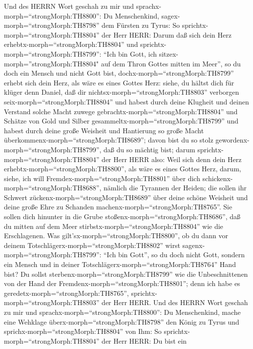  Und des HERRN Wort geschah zu mir und
sprachx-morph=``strongMorph:TH8800'':  Du Menschenkind,
sagex-morph=``strongMorph:TH8798'' dem Fürsten zu Tyrus: So
sprichtx-morph=``strongMorph:TH8804'' der Herr HERR: Darum daß sich dein
Herz erhebtx-morph=``strongMorph:TH8804'' und
sprichtx-morph=``strongMorph:TH8799'': ``Ich bin Gott, ich
sitzex-morph=''strongMorph:TH8804" auf dem Thron Gottes mitten im
Meer'', so du doch ein Mensch und nicht Gott bist,
dochx-morph=``strongMorph:TH8799'' erhebt sich dein Herz, als wäre es
eines Gottes Herz:  siehe, du hältst dich für klüger denn
Daniel, daß dir nichtsx-morph=``strongMorph:TH8803'' verborgen
seix-morph=``strongMorph:TH8804''  und habest durch deine
Klugheit und deinen Verstand solche Macht zuwege
gebrachtx-morph=``strongMorph:TH8804'' und Schätze von Gold und Silber
gesammeltx-morph=``strongMorph:TH8799''  und habest durch
deine große Weisheit und Hantierung so große Macht
überkommenx-morph=``strongMorph:TH8689''; davon bist du so stolz
gewordenx-morph=``strongMorph:TH8799'', daß du so mächtig bist;
 darum sprichtx-morph=``strongMorph:TH8804'' der Herr HERR
also: Weil sich denn dein Herz erhebtx-morph=``strongMorph:TH8800'', als
wäre es eines Gottes Herz,  darum, siehe, ich will
Fremdex-morph=``strongMorph:TH8801'' über dich
schickenx-morph=``strongMorph:TH8688'', nämlich die Tyrannen der Heiden;
die sollen ihr Schwert zückenx-morph=``strongMorph:TH8689'' über deine
schöne Weisheit und deine große Ehre zu Schanden
machenx-morph=``strongMorph:TH8765''.  Sie sollen dich
hinunter in die Grube stoßenx-morph=``strongMorph:TH8686'', daß du
mitten auf dem Meer stirbstx-morph=``strongMorph:TH8804'' wie die
Erschlagenen.  Was gilt'sx-morph=``strongMorph:TH8800'', ob
du dann vor deinem Totschlägerx-morph=``strongMorph:TH8802'' wirst
sagenx-morph=``strongMorph:TH8799'': ``Ich bin Gott'', so du doch nicht
Gott, sondern ein Mensch und in deiner
Totschlägerx-morph=``strongMorph:TH8764'' Hand bist?  Du
sollst sterbenx-morph=``strongMorph:TH8799'' wie die Unbeschnittenen von
der Hand der Fremdenx-morph=``strongMorph:TH8801''; denn ich habe es
geredetx-morph=``strongMorph:TH8765'',
sprichtx-morph=``strongMorph:TH8803'' der Herr HERR.  Und
des HERRN Wort geschah zu mir und sprachx-morph=``strongMorph:TH8800'':
 Du Menschenkind, mache eine Wehklage
überx-morph=``strongMorph:TH8798'' den König zu Tyrus und
sprichx-morph=``strongMorph:TH8804'' von Ihm: So
sprichtx-morph=``strongMorph:TH8804'' der Herr HERR: Du bist ein
